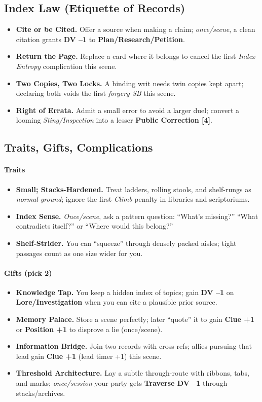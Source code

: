 \documentclass[11pt,letterpaper]{article}
\begin{document}
\subsection*{Index Law (Etiquette of Records)}
\begin{itemize}
\item \textbf{Cite or be Cited.} Offer a source when making a claim; \emph{once/scene}, a clean citation grants \textbf{DV --1} to \textbf{Plan/Research/Petition}.
\item \textbf{Return the Page.} Replace a card where it belongs to cancel the first \emph{Index Entropy} complication this scene.
\item \textbf{Two Copies, Two Locks.} A binding writ needs twin copies kept apart; declaring both voids the first \emph{forgery SB} this scene.
\item \textbf{Right of Errata.} Admit a small error to avoid a larger duel; convert a looming \emph{Sting/Inspection} into a lesser \textbf{Public Correction [4]}.
\end{itemize}

\subsection*{Traits, Gifts, Complications}
\paragraph{Traits}
\begin{itemize}
\item \textbf{Small; Stacks-Hardened.} Treat ladders, rolling stools, and shelf-rungs as \emph{normal ground}; ignore the first \emph{Climb} penalty in libraries and scriptoriums.
\item \textbf{Index Sense.} \emph{Once/scene}, ask a pattern question: ``What's missing?'' ``What contradicts itself?'' or ``Where would this belong?''
\item \textbf{Shelf-Strider.} You can ``squeeze'' through densely packed aisles; tight passages count as one size wider for you.
\end{itemize}

\paragraph{Gifts (pick 2)}
\begin{itemize}
\item \textbf{Knowledge Tap.} You keep a hidden index of topics; gain \textbf{DV --1} on \textbf{Lore/Investigation} when you can cite a plausible prior source.
\item \textbf{Memory Palace.} Store a scene perfectly; later ``quote'' it to gain \textbf{Clue +1} or \textbf{Position +1} to disprove a lie (once/scene).
\item \textbf{Information Bridge.} Join two records with cross-refs; allies pursuing that lead gain \textbf{Clue +1} (lead timer +1) this scene.
\item \textbf{Threshold Architecture.} Lay a subtle through-route with ribbons, tabs, and marks; \emph{once/session} your party gets \textbf{Traverse DV --1} through stacks/archives.
\end{itemize}
\end{document}
